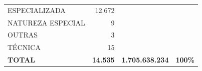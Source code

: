 \documentclass{article}
\begin{document}
\begin{longtable}[c]{m{7cm}|m{2.5cm}|m{2.5cm}|m{2.5cm}}
\multicolumn{1}{L{7cm}|}{ \hspace{3em} ESPECIALIZADA} & \multicolumn{1}{r|}{ 12.672} &  & \\
\multicolumn{1}{L{7cm}|}{ \hspace{3em} NATUREZA ESPECIAL} & \multicolumn{1}{r|}{      9} &  & \\
\multicolumn{1}{L{7cm}|}{ \hspace{3em} OUTRAS} & \multicolumn{1}{r|}{      3} &  & \\
\multicolumn{1}{L{7cm}|}{ \hspace{3em} TÉCNICA} & \multicolumn{1}{r|}{     15} &  & \\
\hline \hline 
\multicolumn{1}{L{7cm}|}{ \textbf{TOTAL}} & \multicolumn{1}{r|}{ \textbf{14.535}} & \multicolumn{1}{r|}{ \textbf{1.705.638.234}} & \multicolumn{1}{r}{ \textbf{100\%}} \\
\end{longtable}
\newpage
\small
\end{document}
